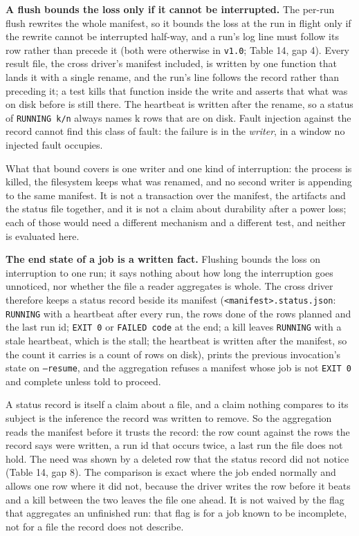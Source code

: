 \documentclass[acmsmall,screen,review]{acmart}
\begin{document}
\textbf{A flush bounds the loss only if it cannot be interrupted.} The per-run flush rewrites the whole manifest, so it bounds the loss at the run in flight only if the rewrite cannot be interrupted half-way, and a run's log line must follow its row rather than precede it (both were otherwise in \texttt{v1.0}; Table 14, gap 4). Every result file, the cross driver's manifest included, is written by one function that lands it with a single rename, and the run's line follows the record rather than preceding it; a test kills that function inside the write and asserts that what was on disk before is still there. The heartbeat is written after the rename, so a status of \texttt{RUNNING k/n} always names k rows that are on disk. Fault injection against the record cannot find this class of fault: the failure is in the \textit{writer}, in a window no injected fault occupies.


What that bound covers is one writer and one kind of interruption: the process is killed, the filesystem keeps what was renamed, and no second writer is appending to the same manifest. It is not a transaction over the manifest, the artifacts and the status file together, and it is not a claim about durability after a power loss; each of those would need a different mechanism and a different test, and neither is evaluated here.


\textbf{The end state of a job is a written fact.} Flushing bounds the loss on interruption to one run; it says nothing about how long the interruption goes unnoticed, nor whether the file a reader aggregates is whole. The cross driver therefore keeps a status record beside its manifest (\texttt{<manifest>.\allowbreak{}status.\allowbreak{}json}: \texttt{RUNNING} with a heartbeat after every run, the rows done of the rows planned and the last run id; \texttt{EXIT 0} or \texttt{FAILED code} at the end; a kill leaves \texttt{RUNNING} with a stale heartbeat, which is the stall; the heartbeat is written after the manifest, so the count it carries is a count of rows on disk), prints the previous invocation's state on \texttt{--resume}, and the aggregation refuses a manifest whose job is not \texttt{EXIT 0} and complete unless told to proceed.


A status record is itself a claim about a file, and a claim nothing compares to its subject is the inference the record was written to remove. So the aggregation reads the manifest before it trusts the record: the row count against the rows the record says were written, a run id that occurs twice, a last run the file does not hold. The need was shown by a deleted row that the status record did not notice (Table 14, gap 8). The comparison is exact where the job ended normally and allows one row where it did not, because the driver writes the row before it beats and a kill between the two leaves the file one ahead. It is not waived by the flag that aggregates an unfinished run: that flag is for a job known to be incomplete, not for a file the record does not describe.
\end{document}
